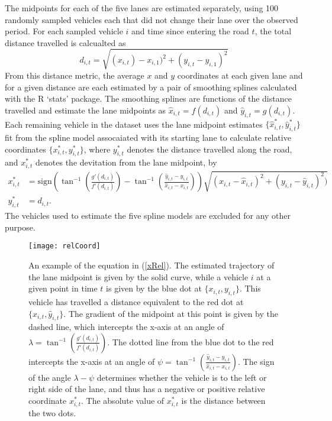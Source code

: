 \documentclass[12pt,a4paper]{article}\usepackage[]{graphicx}\usepackage[]{color}
\begin{document}
The midpoints for each of the five lanes are estimated separately, using 100 randomly sampled vehicles each that did not change their lane over the observed period. For each sampled vehicle $i$ and time since entering the road $t$, the total distance travelled is calcualted as 
\begin{equation}
\label{distance}
d_{i, t} = \sqrt{(x_{i, t}) - x_{i, 1})^2 + (y_{i, t} - y_{i, 1})^2}
\end{equation}
From this distance metric, the average $x$ and $y$ coordinates at each given lane and for a given distance are each estimated by a pair of smoothing splines calculated with the R `stats' package. The smoothing splines are functions of the distance travelled and estimate the lane midpoints as  $\hat{x}_{i, t} = f(d_{i, t})$ and $\hat{y}_{i, t} = g(d_{i, t})$. Each remaining vehicle in the dataset uses the lane midpoint estimates $\{\hat{x}^*_{i, t}, \hat{y}^*_{i, t}\}$ fit from the spline model assocaiated with its starting lane to calculate relative coordinates $\{x^*_{i, t}, y^*_{i, t}\}$, where $y^*_{i, t}$ denotes the distance travelled along the road, and $x^*_{i, t}$ denotes the devitation from the lane midpoint, by
\begin{align}
x^*_{i, t} &= \mbox{sign}\left(\tan^{-1}\left(\frac{g'(d_{i, t}) }{f'(d_{i, t})}\right) - \tan^{-1}\left(\frac{\hat{y}_{i, t} - y_{i, t}}{\hat{x}_{i, t} - x_{i, t}} \right)\right)\sqrt{(x_{i, t}-\hat{x}_{i, t})^2 + (y_{i, t} - \hat{y}_{i, t})^2)} \label{xRel} \\
y^*_{i, t} &= d_{i, t}. \label{yRel}
\end{align}
The vehicles used to estimate the five spline models are excluded for any other purpose.
\begin{figure}
\centering
\texttt{[image: relCoord]}
\caption{An example of the equation in (\ref{xRel}). The estimated trajectory of the lane midpoint is given by the solid curve, while a vehicle $i$ at a given point in time $t$ is given by the blue dot at $\{x_{i, t}, y_{i, t}\}$. This vehicle has travelled a distance equivalent to the red dot at $\{\hat{x}_{i, t}, \hat{y}_{i, t}\}$. The gradient of the midpoint at this point is given by the dashed line, which intercepts the x-axis at an angle of $\lambda = \tan^{-1}\left(\frac{g'(d_{i, t}) }{f'(d_{i, t})}\right)$. The dotted line from the blue dot to the red intercepts the x-axis at an angle of $\psi = \tan^{-1}\left(\frac{\hat{y}_{i, t} - y_{i, t}}{\hat{x}_{i, t} - x_{i, t}} \right)$. The sign of the angle $\lambda - \psi$ determines whether the vehicle is to the left or right side of the lane, and thus has a negative or positive relative coordinate $x^*_{i, t}$. The absolute value of $x^*_{i, t}$ is the distance between the two dots.}
\label{fig:relCoord}
\end{figure}
\end{document}
